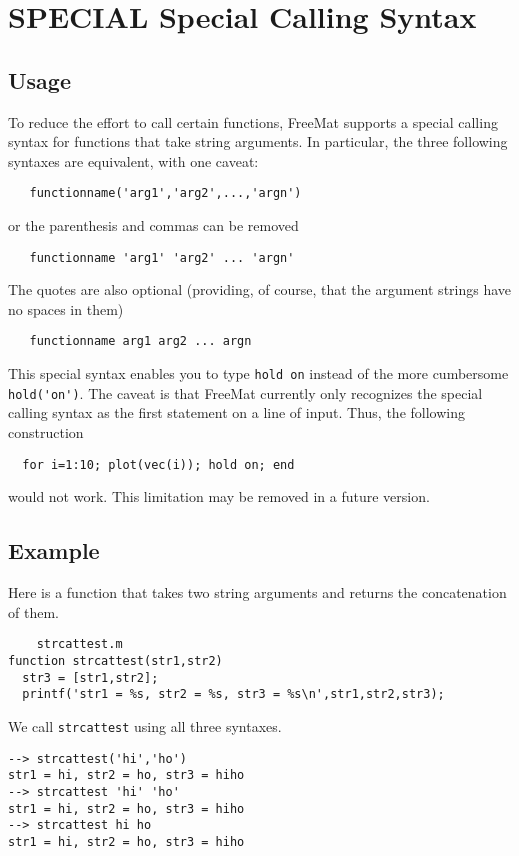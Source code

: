 \section{SPECIAL Special Calling Syntax}

\subsection{Usage}

To reduce the effort to call certain functions, FreeMat supports
a special calling syntax for functions that take string arguments.
In particular, the three following syntaxes are equivalent, with
one caveat:
\begin{verbatim}
   functionname('arg1','arg2',...,'argn')
\end{verbatim}
or the parenthesis and commas can be removed
\begin{verbatim}
   functionname 'arg1' 'arg2' ... 'argn'
\end{verbatim}
The quotes are also optional (providing, of course, that the
argument strings have no spaces in them)
\begin{verbatim}
   functionname arg1 arg2 ... argn
\end{verbatim}
This special syntax enables you to type \verb|hold on| instead of
the more cumbersome \verb|hold('on')|.  The caveat is that FreeMat
currently only recognizes the special calling syntax as the
first statement on a line of input.  Thus, the following construction
\begin{verbatim}
  for i=1:10; plot(vec(i)); hold on; end
\end{verbatim}
would not work.  This limitation may be removed in a future
version.
\subsection{Example}

Here is a function that takes two string arguments and
returns the concatenation of them.
\begin{verbatim}
    strcattest.m
function strcattest(str1,str2)
  str3 = [str1,str2];
  printf('str1 = %s, str2 = %s, str3 = %s\n',str1,str2,str3);
\end{verbatim}
We call \verb|strcattest| using all three syntaxes.
\begin{verbatim}
--> strcattest('hi','ho')
str1 = hi, str2 = ho, str3 = hiho
--> strcattest 'hi' 'ho'
str1 = hi, str2 = ho, str3 = hiho
--> strcattest hi ho
str1 = hi, str2 = ho, str3 = hiho
\end{verbatim}
